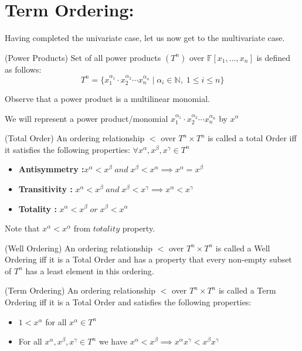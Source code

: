 \section*{Term Ordering:}


Having completed the univariate case, let us now get to the multivariate case.


\begin{definition}(Power Products)
Set of all power products $(T^n)$ over $\mathbb{F}[x_1,\dots,x_n]$ is defined as follows:
$$T^n=\{x_1^{\alpha_{1}}\cdot x_2^{\alpha_{2}}\cdots x_{n}^{\alpha_{n}}\;|\; \alpha_{i}\in \mathbb{N},\;1\leq i\leq n\}$$
\end{definition}
Observe that a power product is a multilinear monomial.

We will represent a power product/monomial $x_1^{\alpha_{1}}\cdot x_2^{\alpha_{2}}\cdots x_{n}^{\alpha_{n}}$ by $x^{\alpha}$ 


\begin{definition}(Total Order)
An ordering relationship $<$ over $T^n \times T^n$ is called a total Order iff it satisfies the following properties:
$ \forall x^{\alpha},x^{\beta},x^{\gamma} \in T^n$
\begin{itemize}
\item \textbf{Antisymmetry :}$ x^{\alpha} < x^{\beta}\; and \;x^{\beta} < x^{\alpha} \implies x^{\alpha} = x^{\beta}$
\item \textbf{Transitivity : }$ x^{\alpha} < x^{\beta} \;and\; x^{\beta} < x^{\gamma} \implies x^{\alpha} < x^{\gamma} $
\item \textbf{ Totality :} $x^{\alpha} < x^{\beta} \;or\; x^{\beta} < x^{\alpha}$
\end{itemize}

Note that $x^{\alpha} < x^{\alpha}$ from $totality$ property.
\end{definition}

\begin{definition}(Well Ordering)
An ordering relationship $<$ over $T^n\times T^n$ is called a Well Ordering iff it is a Total Order and has a property that every non-empty subset of $T^n$ has a least element in this ordering.
\end{definition}

\begin{definition}(Term Ordering)
An ordering relationship $<$ over $T^n\times T^n$ is called a Term Ordering iff it is a Total Order and satisfies the following properties:
\begin{itemize}
\item $1<x^{\alpha}$ for all $x^{\alpha}\in T^n$
\item For all $x^{\alpha},x^{\beta},x^{\gamma}\in T^n$ we have $x^{\alpha}<x^{\beta}\implies x^{\alpha}x^{\gamma}<x^{\beta}x^{\gamma}$
\end{itemize}
\end{definition}


